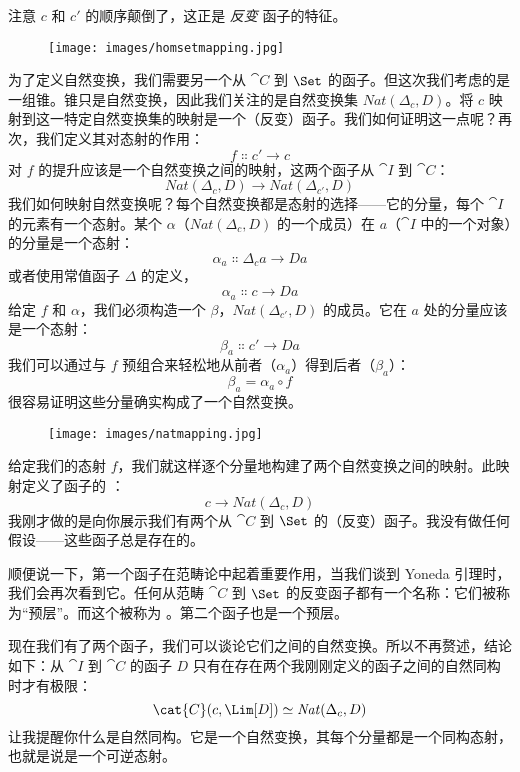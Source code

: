 注意 $c$ 和 $c'$ 的顺序颠倒了，这正是 \emph{反变} 函子的特征。

\begin{figure}[H]
  \centering
  \texttt{[image: images/homsetmapping.jpg]}
\end{figure}

\noindent
为了定义自然变换，我们需要另一个从 $\cat{C}$ 到 $\Set$ 的函子。但这次我们考虑的是一组锥。锥只是自然变换，因此我们关注的是自然变换集 $\mathit{Nat}(\Delta_c, D)$。将 $c$ 映射到这一特定自然变换集的映射是一个（反变）函子。我们如何证明这一点呢？再次，我们定义其对态射的作用：
\[f \Colon c' \to c\]
对 $f$ 的提升应该是一个自然变换之间的映射，这两个函子从 $\cat{I}$ 到 $\cat{C}$：
\[\mathit{Nat}(\Delta_c, D) \to \mathit{Nat}(\Delta_{c'}, D)\]
我们如何映射自然变换呢？每个自然变换都是态射的选择——它的分量，每个 $\cat{I}$ 的元素有一个态射。某个 $\alpha$（$\mathit{Nat}(\Delta_c, D)$ 的一个成员）在 $a$（$\cat{I}$ 中的一个对象）的分量是一个态射：
\[\alpha_a \Colon \Delta_c a \to D a\]
或者使用常值函子 $\Delta$ 的定义，
\[\alpha_a \Colon c \to D a\]
给定 $f$ 和 $\alpha$，我们必须构造一个 $\beta$，$\mathit{Nat}(\Delta_{c'}, D)$ 的成员。它在 $a$ 处的分量应该是一个态射：
\[\beta_a \Colon c' \to D a\]
我们可以通过与 $f$ 预组合来轻松地从前者（$\alpha_a$）得到后者（$\beta_a$）：
\[\beta_a = \alpha_a \circ f\]
很容易证明这些分量确实构成了一个自然变换。

\begin{figure}[H]
  \centering
  \texttt{[image: images/natmapping.jpg]}
\end{figure}

\noindent
给定我们的态射 $f$，我们就这样逐个分量地构建了两个自然变换之间的映射。此映射定义了函子的 ：
\[c \to \mathit{Nat}(\Delta_c, D)\]
我刚才做的是向你展示我们有两个从 $\cat{C}$ 到 $\Set$ 的（反变）函子。我没有做任何假设——这些函子总是存在的。

顺便说一下，第一个函子在范畴论中起着重要作用，当我们谈到 Yoneda 引理时，我们会再次看到它。任何从范畴 $\cat{C}$ 到 $\Set$ 的反变函子都有一个名称：它们被称为“预层”。而这个被称为 。第二个函子也是一个预层。

现在我们有了两个函子，我们可以谈论它们之间的自然变换。所以不再赘述，结论如下：从 $\cat{I}$ 到 $\cat{C}$ 的函子 $D$ 只有在存在两个我刚刚定义的函子之间的自然同构时才有极限：
\[\cat{C}(c, \Lim[D]) \simeq \mathit{Nat}(\Delta_c, D)\]
让我提醒你什么是自然同构。它是一个自然变换，其每个分量都是一个同构态射，也就是说是一个可逆态射。

